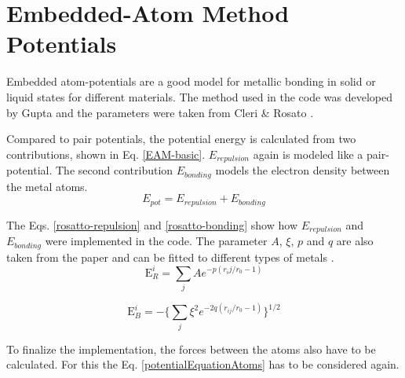 \section{Embedded-Atom Method Potentials}
\begin{comment}
- describe Units 
- better discribed in the course
- good model for metalic systems
- work with gold clusters 

\end{comment}
Embedded atom-potentials are a good model for metallic bonding in solid or liquid states for different materials. The method used in the code was developed by Gupta \cite{gupta} and the parameters were taken from  Cleri \& Rosato \cite{rosato}. 
\par 
\begin{comment}
pair potentials cant model crystals as they have 3 independet elastic constants
put pair potentials have only two -> cauchy pressure
rather heuristic description in the lecture, like basic chemistry
E_pot = E_repulsion + E_embedding (embedding energy is connected to electric density)
E_repulustion is typically a pair potential
E_emedding is a funtiunal of the density in r
\end{comment}
Compared to pair potentials, the potential energy is calculated from two contributions, shown in Eq. \ref{EAM-basic}. $E_{repulsion}$ again is modeled like a pair-potential. The second contribution $E_{bonding}$ models the electron density between the metal atoms. 
\begin{equation}
	\label{EAM-basic}
	E_{pot}  = E_{repulsion} + E_{bonding}
\end{equation}
 
The Eqs. \ref{rosatto-repulsion} and \ref{rosatto-bonding} show how $E_{repulsion}$ and $E_{bonding}$ were implemented in the code. The parameter $A$,  $\xi$, $p$ and $q$ are also taken from the paper and can be fitted to different types of metals \cite{rosato}. 
\begin{equation}
 	\label{rosatto-repulsion}
 	\mathrm{E}_{R}^{i} = \sum_{j} A e^{-p(r_ij/r_{0} - 1)}
 \end{equation}

\begin{equation}
	\label{rosatto-bonding}
	\mathrm{E}_{B}^{i} = - \big\{\sum_{j}\xi^{2} e^{-2q(r_{ij}/r_{0}-1)} \big\}^{1/2}
\end{equation}

To finalize the implementation, the forces between the atoms also have to be calculated. For this the Eq. \ref{potentialEquationAtoms} has to be considered again. 
